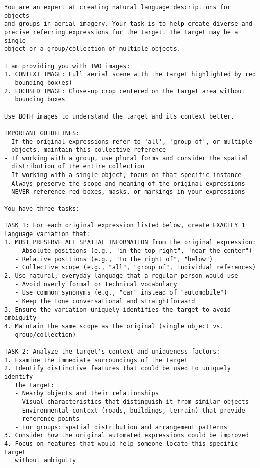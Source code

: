 \begin{small}
\begin{verbatim}
You are an expert at creating natural language descriptions for objects 
and groups in aerial imagery. Your task is to help create diverse and 
precise referring expressions for the target. The target may be a single 
object or a group/collection of multiple objects.

I am providing you with TWO images:
1. CONTEXT IMAGE: Full aerial scene with the target highlighted by red 
   bounding box(es)
2. FOCUSED IMAGE: Close-up crop centered on the target area without 
   bounding boxes

Use BOTH images to understand the target and its context better.

IMPORTANT GUIDELINES:
- If the original expressions refer to 'all', 'group of', or multiple 
  objects, maintain this collective reference
- If working with a group, use plural forms and consider the spatial 
  distribution of the entire collection
- If working with a single object, focus on that specific instance
- Always preserve the scope and meaning of the original expressions
- NEVER reference red boxes, masks, or markings in your expressions

You have three tasks:

TASK 1: For each original expression listed below, create EXACTLY 1 
language variation that:
1. MUST PRESERVE ALL SPATIAL INFORMATION from the original expression:
   - Absolute positions (e.g., "in the top right", "near the center")
   - Relative positions (e.g., "to the right of", "below")
   - Collective scope (e.g., "all", "group of", individual references)
2. Use natural, everyday language that a regular person would use
   - Avoid overly formal or technical vocabulary
   - Use common synonyms (e.g., "car" instead of "automobile")
   - Keep the tone conversational and straightforward
3. Ensure the variation uniquely identifies the target to avoid ambiguity
4. Maintain the same scope as the original (single object vs. 
   group/collection)

TASK 2: Analyze the target's context and uniqueness factors:
1. Examine the immediate surroundings of the target
2. Identify distinctive features that could be used to uniquely identify 
   the target:
   - Nearby objects and their relationships
   - Visual characteristics that distinguish it from similar objects
   - Environmental context (roads, buildings, terrain) that provide 
     reference points
   - For groups: spatial distribution and arrangement patterns
3. Consider how the original automated expressions could be improved
4. Focus on features that would help someone locate this specific target 
   without ambiguity


\end{verbatim}
\end{small}
